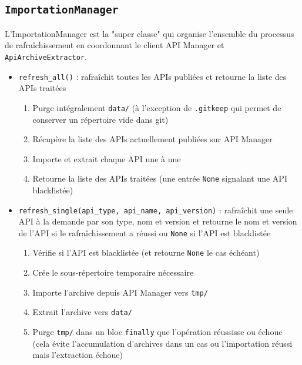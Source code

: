 
\subsection{\texttt{ImportationManager}}
L'ImportationManager est la "super classe" qui organise l'ensemble du processus de rafraîchissement en coordonnant le client API Manager et \texttt{ApiArchiveExtractor}.

\begin{itemize}
    \item[$\bullet$] \texttt{refresh\_all()} : rafraîchit toutes les APIs publiées et retourne la liste des APIs traitées
        \begin{enumerate}
            \item Purge intégralement \texttt{data/} (à l'exception de \texttt{.gitkeep} qui permet de conserver un répertoire vide dans git)
            \item Récupère la liste des APIs actuellement publiées sur API Manager
            \item Importe et extrait chaque API une à une
            \item Retourne la liste des APIs traitées (une entrée \texttt{None} signalant une API blacklistée)
        \end{enumerate}
    \item[$\bullet$] \texttt{refresh\_single(api\_type, api\_name, api\_version)} : rafraîchit une seule API à la demande par son type, nom et version et retourne le nom et version de l'API si le rafraîchissement a réussi ou \texttt{None} si l'API est blacklistée
        \begin{enumerate}
            \item Vérifie si l'API est blacklistée (et retourne \texttt{None} le cas échéant)
            \item Crée le sous-répertoire temporaire nécessaire
            \item Importe l'archive depuis API Manager vers \texttt{tmp/}
            \item Extrait l'archive vers \texttt{data/}
            \item Purge \texttt{tmp/} dans un bloc \texttt{finally} que l'opération réussisse ou échoue (cela évite l'accumulation d'archives dans un cas ou l'importation réussi mais l'extraction échoue)
        \end{enumerate}
\end{itemize}

